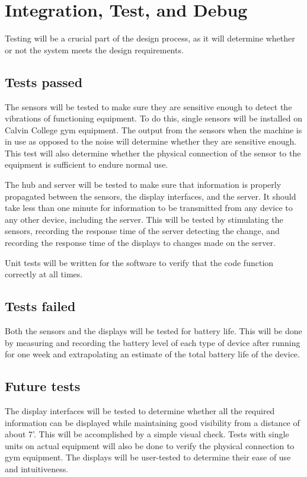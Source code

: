 \documentclass[PPFS.tex]{template/subfiles}
\begin{document}
\section{Integration, Test, and Debug}
Testing will be a crucial part of the design process, as it will determine whether or not the system meets the design requirements.

\subsection{Tests passed}
The sensors will be tested to make sure they are sensitive enough to detect the vibrations of functioning equipment.  To do this, single sensors will be installed on Calvin College gym equipment. The output from the sensors when the machine is in use as opposed to the noise will determine whether they are sensitive enough. This test will also determine whether the physical connection of the sensor to the equipment is sufficient to endure normal use.

The hub and server will be tested to make sure that information is properly propagated between the sensors, the display interfaces, and the server. It should take less than one minute for information to be transmitted from any device to any other device, including the server. This will be tested by stimulating the sensors, recording the response time of the server detecting the change, and recording the response time of the displays to changes made on the server.

Unit tests will be written for the software to verify that the code function correctly at all times.
\subsection{Tests failed}
Both the sensors and the displays will be tested for battery life. This will be done by measuring and recording the battery level of each type of device after running for one week and extrapolating an estimate of the total battery life of the device.
\subsection{Future tests}
The display interfaces will be tested to determine whether all the required information can be displayed while maintaining good visibility from a distance of about 7'. This will be accomplished by a simple visual check. Tests with single units on actual equipment will also be done to verify the physical connection to gym equipment. The displays will be user-tested to determine their ease of use and intuitiveness.
\end{document}
